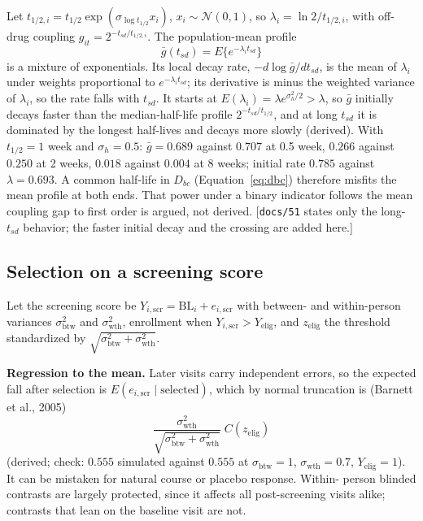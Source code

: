 \documentclass[11pt]{article}
\newcommand{\note}[1]{\textcolor{blue!60!black}{\small [#1]}}
\newcommand{\code}[1]{\texttt{#1}}
\begin{document}
Let $t_{1/2,i} = t_{1/2}\exp(\sigma_{\log t_{1/2}} x_i)$, $x_i \sim \mathcal N(0,1)$, so
$\lambda_i = \ln 2/t_{1/2,i}$, with off-drug coupling $g_{it} =
2^{-t_{sd}/t_{1/2,i}}$. The population-mean profile
\begin{equation}
\bar g(t_{sd}) = E\{e^{-\lambda_i t_{sd}}\}
\label{eq:pd-mixexp}
\end{equation}
is a mixture of exponentials. Its local decay rate,
$-d\log\bar g/dt_{sd}$, is the mean of $\lambda_i$ under weights
proportional to $e^{-\lambda_i t_{sd}}$; its derivative is minus the
weighted variance of $\lambda_i$, so the rate falls with $t_{sd}$.
It starts at $E(\lambda_i) = \lambda e^{\sigma_h^2/2} > \lambda$, so
$\bar g$ initially decays faster than the median-half-life profile
$2^{-t_{sd}/t_{1/2}}$, and at long $t_{sd}$ it is dominated by the
longest half-lives and decays more slowly (derived). With
$t_{1/2} = 1$ week and $\sigma_h = 0.5$: $\bar g = 0.689$ against
$0.707$ at 0.5 week, $0.266$ against $0.250$ at 2 weeks, $0.018$
against $0.004$ at 8 weeks; initial rate $0.785$ against
$\lambda = 0.693$. A common half-life in $D_{bc}$
(Equation~\eqref{eq:dbc}) therefore misfits the mean profile at both
ends. That power under a binary indicator follows the mean coupling
gap to first order is argued, not derived. \note{\code{docs/51} states
only the long-$t_{sd}$ behavior; the faster initial decay and the
crossing are added here.}

\subsection{Selection on a screening score}

Let the screening score be $Y_{i,\text{scr}} = \mathrm{BL}_i +
e_{i,\text{scr}}$ with between- and within-person variances
$\sigma^2_{\text{btw}}$ and $\sigma^2_{\text{wth}}$, enrollment when
$Y_{i,\text{scr}} > Y_{\text{elig}}$, and $z_{\text{elig}}$ the threshold standardized by
$\sqrt{\sigma^2_{\text{btw}} + \sigma^2_{\text{wth}}}$.

\textbf{Regression to the mean.} Later visits carry independent errors,
so the expected fall after selection is $E(e_{i,\text{scr}} \mid
\text{selected})$, which by normal truncation is (Barnett et al.,
2005)
\begin{equation}
\frac{\sigma^2_{\text{wth}}}{\sqrt{\sigma^2_{\text{btw}} +
  \sigma^2_{\text{wth}}}}\; C(z_{\text{elig}})
\label{eq:pd-rtm}
\end{equation}
(derived; check: $0.555$ simulated against $0.555$ at
$\sigma_{\text{btw}} = 1$, $\sigma_{\text{wth}} = 0.7$, $Y_{\text{elig}} = 1$).
It can be mistaken for natural course or placebo response. Within-
person blinded contrasts are largely protected, since it affects all
post-screening visits alike; contrasts that lean on the baseline visit
are not.
\end{document}
